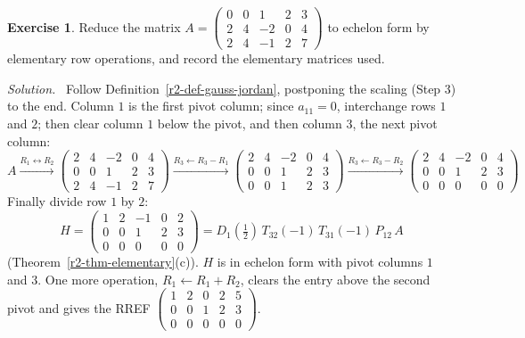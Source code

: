 \documentclass[12pt]{article}
\theoremstyle{definition}
\newtheorem{exercise}{Exercise}
\newenvironment{solution}{\par\noindent\textit{Solution.}\ }{\par\smallskip}
\begin{document}
\begin{exercise}\label{r2-ex-echelon}
Reduce the matrix
\(A=\begin{pmatrix}0&0&1&2&3\\2&4&-2&0&4\\2&4&-1&2&7\end{pmatrix}\)
to echelon form by elementary row operations, and record the elementary matrices used.
\end{exercise}
\begin{solution}
Follow Definition~\ref{r2-def-gauss-jordan}, postponing the scaling (Step 3) to the end.
Column \(1\) is the first pivot column; since \(a_{11}=0\), interchange rows \(1\) and \(2\);
then clear column \(1\) below the pivot, and then column \(3\), the next pivot column:
\[
A\xrightarrow{R_1\leftrightarrow R_2}
\begin{pmatrix}2&4&-2&0&4\\0&0&1&2&3\\2&4&-1&2&7\end{pmatrix}
\xrightarrow{R_3\leftarrow R_3-R_1}
\begin{pmatrix}2&4&-2&0&4\\0&0&1&2&3\\0&0&1&2&3\end{pmatrix}
\xrightarrow{R_3\leftarrow R_3-R_2}
\begin{pmatrix}2&4&-2&0&4\\0&0&1&2&3\\0&0&0&0&0\end{pmatrix}
\]
Finally divide row \(1\) by \(2\):
\[
H=\begin{pmatrix}1&2&-1&0&2\\0&0&1&2&3\\0&0&0&0&0\end{pmatrix}
=D_1(\tfrac12)\,T_{32}(-1)\,T_{31}(-1)\,P_{12}\,A
\]
(Theorem~\ref{r2-thm-elementary}(c)). \(H\) is in echelon form with pivot columns \(1\) and
\(3\). One more operation, \(R_1\leftarrow R_1+R_2\), clears the entry above the second pivot
and gives the RREF
\(\left(\begin{smallmatrix}1&2&0&2&5\\0&0&1&2&3\\0&0&0&0&0\end{smallmatrix}\right)\).
\end{solution}
\end{document}
